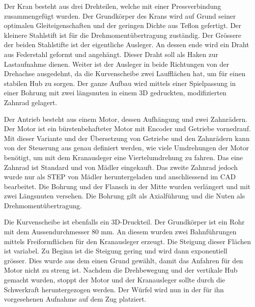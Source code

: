 \documentclass[../../main.tex]{subfiles}
\begin{document}
    Der Kran besteht aus drei Drehteilen, welche mit einer Pressverbindung zusammengefügt wurden. Der Grundkörper des Krans wird auf Grund seiner optimalen Gleiteigenschaften und der geringen Dichte aus Teflon gefertigt. Der kleinere Stahlstift ist für die Drehmomentübertragung zuständig. Der Grössere der beiden Stahlstifte ist der eigentliche Ausleger. An dessen ende wird ein Draht aus Federstahl geformt und angehängt. Dieser Draht soll als Haken zur Lastaufnahme dienen. Weiter ist der Ausleger in beide Richtungen von der Drehachse ausgedehnt, da die Kurvenscheibe zwei Laufflächen hat, um für einen stabilen Hub zu sorgen. Der ganze Aufbau wird mittels einer Spielpassung in einer Bohrung mit zwei längsnuten in einem 3D gedruckten, modifizierten Zahnrad gelagert.

    Der Antrieb besteht aus einem Motor, dessen Aufhängung und zwei Zahnrädern. Der Motor ist ein bürstenbehafteter Motor mit Encoder und Getriebe vornedrauf. Mit dieser Variante und der Übersetzung von Getriebe und den Zahnrädern kann von der Steuerung aus genau definiert werden, wie viele Umdrehungen der Motor benötigt, um mit dem Kranausleger eine Viertelumdrehung zu fahren. Das eine Zahnrad ist Standard und von Mädler eingekauft. Das zweite Zahnrad jedoch wurde nur als STEP von Mädler heruntergeladen und anschliessend im CAD bearbeitet. Die Bohrung und der Flansch in der Mitte wurden verlängert und mit zwei Längsnuten versehen. Die Bohrung gilt als Axialführung und die Nuten als Drehmomentübertragung.

    Die Kurvenscheibe ist ebenfalls ein 3D-Druckteil. Der Grundkörper ist ein Rohr mit dem Aussendurchmesser 80 mm. An diesem wurden zwei Bahnführungen mittels Freiformflächen für den Kranausleger erzeugt. Die Steigung dieser Flächen ist variabel. Zu Beginn ist die Steigung gering und wird dann exponentiell grösser. Dies wurde aus dem einen Grund gewählt, damit das Anfahren für den Motor nicht zu streng ist. Nachdem die Drehbewegung und der vertikale Hub gemacht wurden, stoppt der Motor und der Kranausleger sollte durch die Schwerkraft heruntergezogen werden. Der Würfel wird nun in der für ihn vorgesehenen Aufnahme auf dem Zug platziert.
\end{document}

